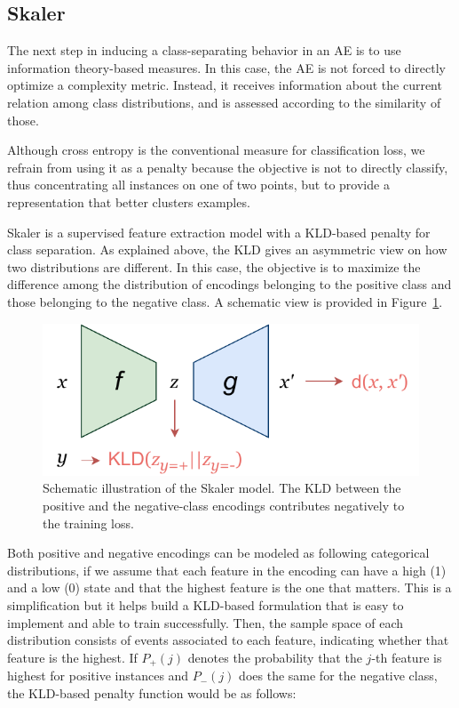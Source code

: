 \documentclass[
	fontsize=11pt, %
	twoside=false, %
	open=any, %
	secnumdepth=1, %
]{kaobook}
\newcommand{\change}[1]{{\color{blue}#1}}
\renewcommand{\change}[1]{#1}
\begin{document}
\subsection{Skaler}

The next step in inducing a class-separating behavior in an AE is to use information theory-based measures. In this case, the AE is not forced to directly optimize a complexity metric. Instead, it receives information about the current relation among class distributions, and is assessed according to the similarity of those.

Although cross entropy is the conventional measure for classification loss, we refrain from using it as a penalty because the objective is not to directly classify, thus concentrating all instances on one of two points, but to provide a representation that better clusters examples.

Skaler is a supervised feature extraction model with a KLD-based penalty for class separation. As explained above, the KLD gives an asymmetric view on how two distributions are different. In this case, the objective is to maximize the difference among the distribution of encodings belonging to the positive class and those belonging to the negative class. A schematic view is provided in Figure~\ref{fig.skaler}.

\begin{figure}[ht]
  \centering
  \includegraphics[width=.35\textwidth]{skaler.pdf}
  \caption{\label{fig.skaler}\change{Schematic illustration of the Skaler model. The KLD between the positive and the negative-class encodings contributes negatively to the training loss.}}
\end{figure}

Both positive and negative encodings can be modeled as following categorical distributions, if we assume that each feature in the encoding can have a high (1) and a low (0) state and that the highest feature is the one that matters. This is a simplification but it helps build a KLD-based formulation that is easy to implement and able to train successfully. Then, the sample space of each distribution consists of events associated to each feature, indicating whether that feature is the highest. If $P_+(j)$ denotes the probability that the $j$-th feature is highest for positive instances and $P_-(j)$ does the same for the negative class, the KLD-based penalty function would be as follows:
\end{document}
